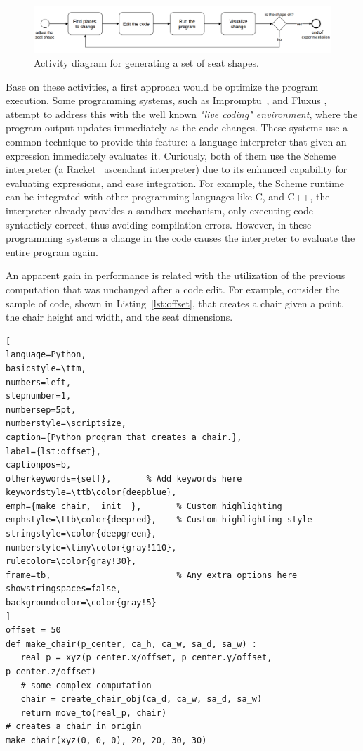 \begin{figure}[!htbp]
  \centering
  \includegraphics[width=1\textwidth]{images/run-activity}
    \caption{Activity diagram for generating a set of seat shapes.}
  \label{fig:run-activity}
\end{figure}

Base on these activities, a first approach would be optimize the program execution. Some programming systems, such as Impromptu~\citep{sorensen2005impromptu}, and Fluxus \citep{griffiths2007fluxus}, attempt to address this with the well known \textit{"live coding" environment}, where the program output updates immediately as the code changes. These systems use a common technique to provide this feature: a language interpreter that given an expression immediately evaluates it. Curiously, both of them use the Scheme interpreter (a Racket~\citep{findler2002drscheme} ascendant interpreter) due to its enhanced capability for evaluating expressions, and ease integration. For example, the Scheme runtime can be integrated with other programming languages like C, and C++, the interpreter already provides a sandbox mechanism, only executing code syntacticly correct, thus avoiding compilation errors. However, in these programming systems a change in the code causes the interpreter to evaluate the entire program again.

An apparent gain in performance is related with the utilization of the previous computation that was unchanged after a code edit. For example, consider the sample of code, shown in Listing~\ref{lst:offset}, that creates a chair given a point, the chair height and width, and the seat dimensions. \\ 

\begin{lstlisting}[
language=Python,
basicstyle=\ttm,
numbers=left,
stepnumber=1,
numbersep=5pt,                   
numberstyle=\scriptsize, 
caption={Python program that creates a chair.},
label={lst:offset},
captionpos=b, 
otherkeywords={self},       % Add keywords here
keywordstyle=\ttb\color{deepblue},
emph={make_chair,__init__},       % Custom highlighting
emphstyle=\ttb\color{deepred},    % Custom highlighting style
stringstyle=\color{deepgreen},
numberstyle=\tiny\color{gray!110},
rulecolor=\color{gray!30},
frame=tb,                         % Any extra options here
showstringspaces=false,
backgroundcolor=\color{gray!5} 
]
offset = 50
def make_chair(p_center, ca_h, ca_w, sa_d, sa_w) :
   real_p = xyz(p_center.x/offset, p_center.y/offset, p_center.z/offset)
   # some complex computation
   chair = create_chair_obj(ca_d, ca_w, sa_d, sa_w)
   return move_to(real_p, chair)
# creates a chair in origin
make_chair(xyz(0, 0, 0), 20, 20, 30, 30)
\end{lstlisting}

